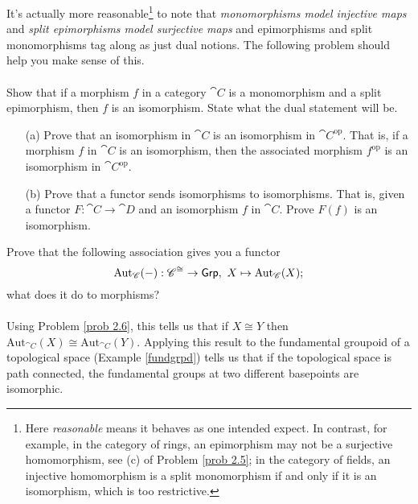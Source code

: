 \begin{problem}\label{prob 2.5a}
It's actually more reasonable\footnote{Here \emph{reasonable} means it behaves as one intended expect. In contrast, for example, in the category of rings, an epimorphism may not be a surjective homomorphism, see (c) of Problem \ref{prob 2.5}; in the category of fields, an injective homomorphism is a split monomorphism if and only if it is an isomorphism, which is too restrictive.} to note that \emph{monomorphisms model injective maps} and \emph{split epimorphisms model surjective maps} and epimorphisms and split monomorphisms tag along as just dual notions. The following problem should help you make sense of this.\\
\\
Show that if a morphism $f$ in a category $\cat{C}$ is a monomorphism and a split epimorphism, then $f$ is an isomorphism. State what the dual statement will be.
\end{problem}

\vspace{0.1in}

\begin{problem}\label{prob 2.6}\hfill
\begin{itemize}
\item[(a)] Prove that an isomorphism in $\cat{C}$ is an isomorphism in $\cat{C}^{\text{op}}$. That is, if a morphism $f$ in $\cat{C}$ is an isomorphism, then the associated morphism $f^{\text{op}}$ is an isomorphism in $\cat{C}^{\text{op}}$.
\item[(b)] Prove that a functor sends isomorphisms to isomorphisms. That is, given a functor $F: \cat{C} \to \cat{D}$ and an isomorphism $f$ in $\cat{C}$. Prove $F(f)$ is an isomorphism.
\end{itemize}
\end{problem}

\vspace{0.1in}

\begin{problem}\label{prob 2.7}
Prove that the following association gives you a functor
\[\mathrm{Aut}_{\mathscr{C}}(-):\mathscr{C}^{\cong} \to \mathsf{Grp},\ X \mapsto \mathrm{Aut}_{\mathscr{C}}(X);\]
what does it do to morphisms?\\
\\
Using Problem \ref{prob 2.6}, this tells us that if $X \cong Y$ then $\mathrm{Aut}_{\cat{C}}(X) \cong \mathrm{Aut}_{\cat{C}}(Y)$. Applying this result to the fundamental groupoid of a topological space (Example \ref{fundgrpd}) tells us that if the topological space is path connected, the fundamental groups at two different basepoints are isomorphic.
\end{problem}


